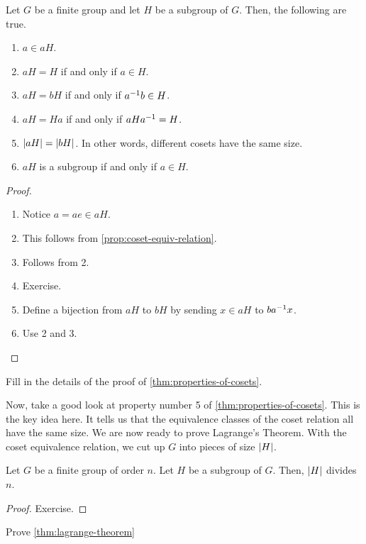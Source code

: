 \documentclass[./main.tex]{subfiles}
\begin{document}
\begin{theorem}
\label{thm:properties-of-cosets}
    Let $G$ be a finite group and let $H$ be a subgroup of $G$. Then, the following are true.

    \begin{enumerate}
        \item $a \in aH$.
        \item $aH = H$ if and only if $a \in H$.
        \item $aH = bH$ if and only if $a^{-1} b \in H$.
        \item $aH = Ha$ if and only if $aHa^{-1} = H$.
        \item $\abs{aH} = \abs{bH}$. In other words, different cosets have the same size.
        \item $aH$ is a subgroup if and only if $a \in H$.
    \end{enumerate}
\end{theorem}
\begin{proof}
    \begin{enumerate}
        \item Notice $a = ae \in aH$.
        \item This follows from \cref{prop:coset-equiv-relation}.
        \item Follows from 2.
        \item Exercise. 
        \item Define a bijection from $aH$ to $bH$ by sending $x \in aH$ to $ba^{-1} x$.
        \item Use 2 and 3.
    \end{enumerate}
\end{proof}
\begin{exercise}
    Fill in the details of the proof of \cref{thm:properties-of-cosets}.
\end{exercise}

Now, take a good look at property number 5 of \cref{thm:properties-of-cosets}.
This is the key idea here. It tells us that the equivalence classes of the coset
relation all have the same size. We are now ready to prove Lagrange's Theorem. With
the coset equivalence relation, we cut up $G$ into pieces of size $\abs{H}$. 
\begin{theorem}
\label{thm:lagrange-theorem}
    Let $G$ be a finite group of order $n$. Let $H$ be a subgroup of $G$. Then,
    $\abs{H}$ divides $n$.
\end{theorem}
\begin{proof}
    Exercise.
\end{proof}
\begin{exercise}
    Prove \cref{thm:lagrange-theorem}
\end{exercise}
\end{document}
